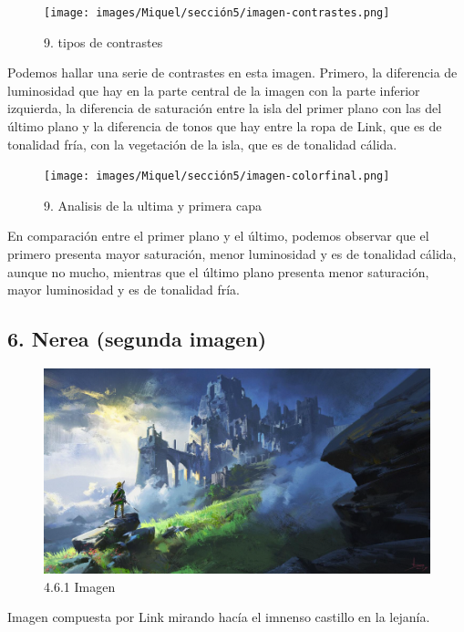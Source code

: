 \documentclass[12pt]{article}
\begin{document}
\begin{figure}[H]
      \centering
      \texttt{[image: images/Miquel/sección5/imagen-contrastes.png]}
      \caption{\small 9. tipos de contrastes}
    \end{figure}
    
    Podemos hallar una serie de contrastes en esta imagen. Primero, la diferencia de luminosidad que hay en la parte central de la imagen con la parte inferior izquierda, la diferencia de saturación entre  la isla del primer plano con las del último plano y la diferencia de tonos que hay entre la ropa de Link, que es de tonalidad fría, con la vegetación de la isla, que es de tonalidad cálida.

    \begin{figure}[H]
      \centering
      \texttt{[image: images/Miquel/sección5/imagen-colorfinal.png]}
      \caption{\small 9. Analisis de la ultima y primera capa}
    \end{figure}

    En comparación entre el primer plano y el último, podemos observar que el primero presenta mayor saturación, menor luminosidad y es de tonalidad cálida, aunque no mucho, mientras que el último plano presenta menor saturación, mayor luminosidad y es de tonalidad fría.


    \subsection{6. Nerea (segunda imagen)}
    \begin{figure}[H]
      \centering
      \includegraphics[scale=0.4]{images/Nerea/6_concept_art.png}
      \caption{\small 4.6.1 Imagen}
    \end{figure}
    Imagen compuesta por Link mirando hacía el imnenso castillo en la lejanía.
\end{document}
